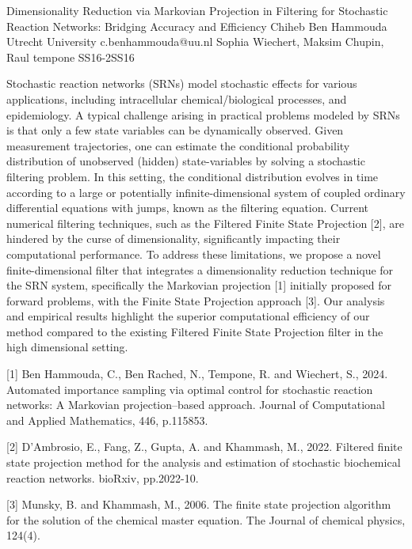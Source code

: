 	\begin{talk}
		{Dimensionality Reduction via Markovian Projection in Filtering for Stochastic Reaction Networks:  Bridging Accuracy and Efficiency}%
		{Chiheb Ben Hammouda}%
		{Utrecht University}%
		{c.benhammouda@uu.nl}%
		{Sophia Wiechert, Maksim Chupin, Raul tempone}%
{}{}{SS16-2}{SS16}

		
		
		
		
	Stochastic reaction networks (SRNs)  model  stochastic effects for  various applications, including intracellular chemical/biological processes, and  epidemiology. A typical challenge arising in practical problems modeled by SRNs is that only a few state variables can be dynamically observed. Given measurement trajectories, one can estimate the conditional probability distribution of unobserved (hidden) state-variables  by solving a stochastic filtering problem. In this setting, the conditional distribution evolves in time according to a large or potentially infinite-dimensional system of coupled ordinary differential equations with jumps, known as the filtering equation. Current numerical filtering techniques, such as the Filtered Finite State Projection [2], are hindered by the curse of dimensionality, significantly impacting their computational performance. To address these limitations, we propose a novel finite-dimensional filter that  integrates a dimensionality reduction technique for the SRN system, specifically the Markovian projection [1] initially proposed for forward problems, with the Finite State Projection approach [3]. Our analysis and empirical results highlight  the superior  computational efficiency of our method compared to the existing Filtered Finite State Projection filter in the high dimensional setting.

		
		\medskip
		
		[1] Ben Hammouda, C., Ben Rached, N., Tempone, R. and Wiechert, S., 2024. Automated importance sampling via optimal control for stochastic reaction networks: A Markovian projection–based approach. Journal of Computational and Applied Mathematics, 446, p.115853.
		
	[2]  D’Ambrosio, E., Fang, Z., Gupta, A. and Khammash, M., 2022. Filtered finite state projection method for the analysis and estimation of stochastic biochemical reaction networks. bioRxiv, pp.2022-10.
	
	[3] Munsky, B. and Khammash, M., 2006. The finite state projection algorithm for the solution of the chemical master equation. The Journal of chemical physics, 124(4).
	\end{talk}

